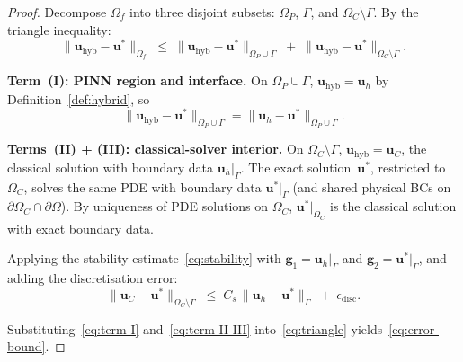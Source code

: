 \documentclass[11pt]{article}
\begin{document}
\begin{proof}
Decompose $\Omega_f$ into three disjoint subsets:
$\Omega_P$, $\Gamma$, and $\Omega_C \setminus \Gamma$.  By the triangle inequality:
\begin{equation}\label{eq:triangle}
  \bigl\|\mathbf{u}_{\mathrm{hyb}} - \mathbf{u}^*\bigr\|_{\Omega_f}
  \;\le\; \bigl\|\mathbf{u}_{\mathrm{hyb}} - \mathbf{u}^*\bigr\|_{\Omega_P \cup \Gamma}
  \;+\; \bigl\|\mathbf{u}_{\mathrm{hyb}} - \mathbf{u}^*\bigr\|_{\Omega_C \setminus \Gamma}.
\end{equation}

\textbf{Term~(I): PINN region and interface.}
On $\Omega_P \cup \Gamma$, $\mathbf{u}_{\mathrm{hyb}} = \mathbf{u}_h$ by
Definition~\ref{def:hybrid}, so
\begin{equation}\label{eq:term-I}
  \bigl\|\mathbf{u}_{\mathrm{hyb}} - \mathbf{u}^*\bigr\|_{\Omega_P \cup \Gamma}
  = \bigl\|\mathbf{u}_h - \mathbf{u}^*\bigr\|_{\Omega_P \cup \Gamma}.
\end{equation}

\textbf{Terms~(II) + (III): classical-solver interior.}
On $\Omega_C \setminus \Gamma$, $\mathbf{u}_{\mathrm{hyb}} = \mathbf{u}_C$, the
classical solution with boundary data $\mathbf{u}_h\big|_\Gamma$.  The exact
solution~$\mathbf{u}^*$, restricted to $\Omega_C$, solves the same PDE with
boundary data $\mathbf{u}^*\big|_\Gamma$ (and shared physical BCs on
$\partial\Omega_C \cap \partial\Omega$).  By uniqueness of PDE solutions on
$\Omega_C$, $\mathbf{u}^*\big|_{\Omega_C}$ is the classical solution with exact
boundary data.

Applying the stability estimate~\eqref{eq:stability} with
$\mathbf{g}_1 = \mathbf{u}_h\big|_\Gamma$ and
$\mathbf{g}_2 = \mathbf{u}^*\big|_\Gamma$, and adding the discretisation error:
\begin{equation}\label{eq:term-II-III}
  \bigl\|\mathbf{u}_C - \mathbf{u}^*\bigr\|_{\Omega_C \setminus \Gamma}
  \;\le\; C_s\,\bigl\|\mathbf{u}_h - \mathbf{u}^*\bigr\|_\Gamma
  \;+\; \epsilon_{\mathrm{disc}}.
\end{equation}

Substituting~\eqref{eq:term-I} and~\eqref{eq:term-II-III}
into~\eqref{eq:triangle} yields~\eqref{eq:error-bound}.
\end{proof}
\end{document}

